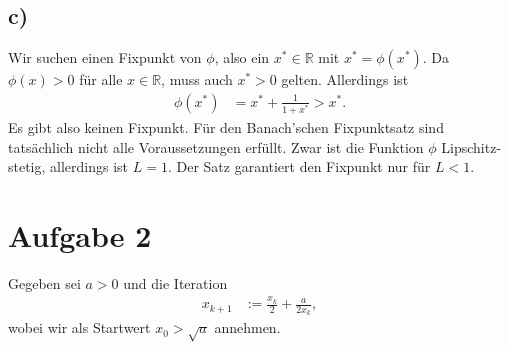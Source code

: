 \documentclass[english, parskip=full]{scrartcl}
\begin{document}
\subsection*{c)}
Wir suchen einen Fixpunkt von $\phi$, also ein $x^\ast\in\mathbb{R}$ mit $x^\ast = \phi(x^\ast)$.
Da $\phi(x) > 0$ für alle $x\in\mathbb{R}$, muss auch $x^\ast > 0$ gelten.
Allerdings ist
\begin{align}
\phi(x^\ast) &= x^\ast + \frac{1}{1 + x^\ast} > x^\ast.
\end{align}
Es gibt also keinen Fixpunkt.
Für den Banach'schen Fixpunktsatz sind tatsächlich nicht alle Voraussetzungen erfüllt.
Zwar ist die Funktion $\phi$ Lipschitz-stetig, allerdings ist $L=1$.
Der Satz garantiert den Fixpunkt nur für $L<1$.

\newpage
\section*{Aufgabe 2}
Gegeben sei $a>0$ und die Iteration
\begin{align}
x_{k+1} &:= \frac{x_k}{2} + \frac{a}{2x_k},
\end{align}
wobei wir als Startwert $x_0 > \sqrt{a}$ annehmen.
\end{document}
